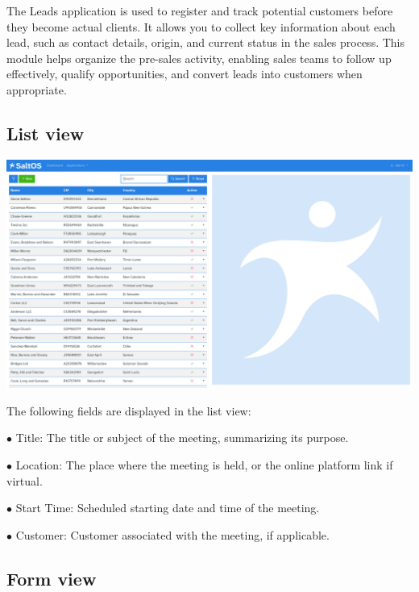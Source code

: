 \documentclass[a4paper]{article}
\begin{document}
The Leads application is used to register and track potential customers before they become actual clients.
It allows you to collect key information about each lead, such as contact details, origin, and current status in the sales process.
This module helps organize the pre-sales activity, enabling sales teams to follow up effectively, qualify opportunities,
and convert leads into customers when appropriate.

\hypertarget{toc58}{}
\subsection{List view}

\begin{center}\includegraphics[width=1\textwidth]{../ujest/snaps/test-screenshots-js-screenshots-crm-leads-list-en-us-1-snap.png}\end{center}

The following fields are displayed in the list view:

\begin{compactitem}
\item[\color{myblue}$\bullet$] Title: The title or subject of the meeting, summarizing its purpose.
\item[\color{myblue}$\bullet$] Location: The place where the meeting is held, or the online platform link if virtual.
\item[\color{myblue}$\bullet$] Start Time: Scheduled starting date and time of the meeting.
\item[\color{myblue}$\bullet$] Customer: Customer associated with the meeting, if applicable.
\end{compactitem}

\hypertarget{toc59}{}
\subsection{Form view}
\end{document}
